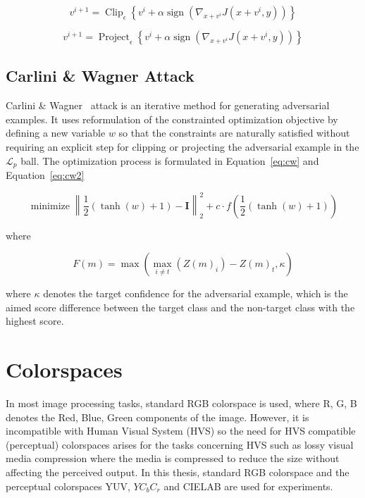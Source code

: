 \begin{equation}
    \label{eq:bim}
    v^{i+1}=\operatorname{Clip}_{\epsilon}\left\{v^{i}+\alpha \operatorname{sign}\left(\nabla_{x+v^{i}} J\left(x+v^{i}, y\right)\right)\right\}
\end{equation}

\begin{equation}
    \label{eq:pgd}
    v^{i+1}=\operatorname{Project}_{\epsilon}\left\{v^{i}+\alpha \operatorname{sign}\left(\nabla_{x+v^{i}} J\left(x+v^{i}, y\right)\right)\right\}
\end{equation}


\subsection{Carlini \& Wagner Attack}
Carlini \& Wagner~\cite{carlini2017towards} attack is an iterative method for generating adversarial examples. It uses reformulation of the constrainted optimization objective by defining a new variable \(w\) so that the constraints are naturally satisfied without requiring an explicit step for clipping or projecting the adversarial example in the \(\mathcal{L}_p\) ball. The optimization process is formulated in Equation~\ref{eq:cw} and Equation~\ref{eq:cw2}

\begin{equation}
    \label{eq:cw}
    \operatorname{minimize}\left\|\frac{1}{2}(\tanh (w)+1)-\boldsymbol{I}\right\|_{2}^{2}+c \cdot f\left(\frac{1}{2}(\tanh (w)+1)\right)
\end{equation}

where

\begin{equation}
    \label{eq:cw2}
    F(m)=\max \left(\max _{i \neq t}\left(Z(m)_{i}\right)-Z(m)_{t}, \kappa\right)
\end{equation}

where \(\kappa\) denotes the target confidence for the adversarial example, which is the aimed score difference between the target class and the non-target class with the highest score.



\section{Colorspaces}
In most image processing tasks, standard RGB colorspace is used, where R, G, B denotes the Red, Blue, Green components of the image. However, it is incompatible with Human Visual System (HVS) so the need for HVS compatible (perceptual) colorspaces arises for the tasks concerning HVS such as lossy visual media compression where the media is compressed to reduce the size without affecting the perceived output. In this thesis, standard RGB colorspace and the perceptual colorspaces YUV, \(YC_{b}C_{r}\) and CIELAB are used for experiments.


